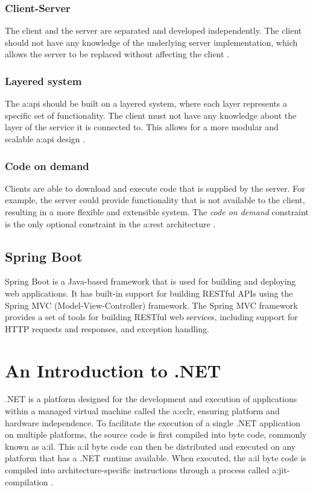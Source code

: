 \subsubsection{Client-Server}
The client and the server are separated and developed independently. The client should not have any knowledge of the underlying server implementation, which allows the server to be replaced without affecting the client \cite{RESTGuidelines}.
\subsubsection{Layered system}
The \gls{a:api} should be built on a layered system, where each layer represents a specific set of functionality. The client must not have any knowledge about the layer of the service it is connected to. This allows for a more modular and scalable \gls{a:api} design \cite{RESTGuidelines}.
\subsubsection{Code on demand}
Clients are able to download and execute code that is supplied by the server. For example, the server could provide functionality that is not available to the client, resulting in a more flexible and extensible system. The \textit{code on demand} constraint is the only optional constraint in the \gls{a:rest} architecture \cite{RESTGuidelines}.

\subsection{Spring Boot}
Spring Boot is a Java-based framework that is used for building and deploying web applications.
It has built-in support for building RESTful APIs using the Spring MVC (Model-View-Controller) framework. The Spring MVC framework provides a set of tools for building RESTful web services, including support for HTTP requests and responses, and exception handling.


\section{An Introduction to .NET}\label{sec:tf-dotnet}

.NET is a platform designed for the development and execution of applications within a managed virtual machine called the \gls{a:cclr}, ensuring platform and hardware independence. To facilitate the execution of a single .NET application on multiple platforms, the source code is first compiled into byte code, commonly known as \gls{a:il}. This \gls{a:il} byte code can then be distributed and executed on any platform that has a .NET runtime available. When executed, the \gls{a:il} byte code is compiled into architecture-specific instructions through a process called \gls{a:jit}-compilation \cite[9--12,290]{ecma335cli}\cite{GitHubTieredJittingDocs}.

